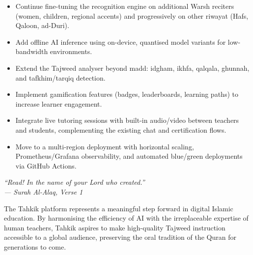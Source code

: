 \begin{goldbox}[title=Future Perspectives]
\begin{itemize}
  \item Continue fine-tuning the recognition engine on additional Warsh
        reciters (women, children, regional accents) and progressively
        on other riwayat (Hafs, Qaloon, ad-Duri).
  \item Add offline AI inference using on-device, quantised model
        variants for low-bandwidth environments.
  \item Extend the Tajweed analyser beyond madd: idgham, ikhfa,
        qalqala, ghunnah, and tafkhim/tarqiq detection.
  \item Implement gamification features (badges, leaderboards, learning
        paths) to increase learner engagement.
  \item Integrate live tutoring sessions with built-in audio/video
        between teachers and students, complementing the existing chat
        and certification flows.
  \item Move to a multi-region deployment with horizontal scaling,
        Prometheus/Grafana observability, and automated blue/green
        deployments via GitHub Actions.
\end{itemize}
\end{goldbox}

\begin{emeraldbox}[title=Closing Statement]
\begin{center}
\large\itshape
``Read! In the name of your Lord who created.''\\[6pt]
\normalsize\normalfont\color{black} --- Surah Al-Alaq, Verse 1
\end{center}
\vspace{6pt}
\normalsize
The Tahkik platform represents a meaningful step forward in digital
Islamic education. By harmonising the efficiency of AI with the
irreplaceable expertise of human teachers, Tahkik aspires to make
high-quality Tajweed instruction accessible to a global audience,
preserving the oral tradition of the Quran for generations to come.
\end{emeraldbox}
